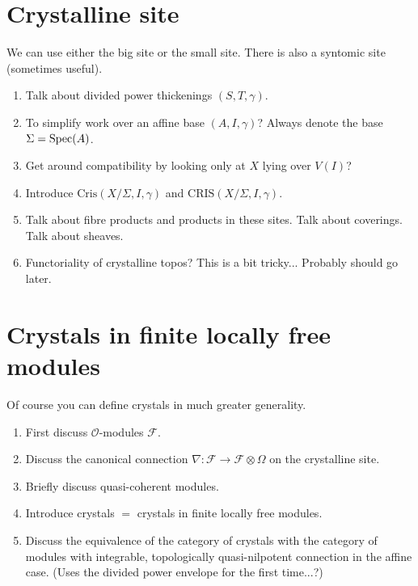 \section{Crystalline site}
\label{section-site}

\noindent
We can use either the big site or the small site.
There is also a syntomic site (sometimes useful).

\begin{enumerate}
\item Talk about divided power thickenings $(S, T, \gamma)$.
\item To simplify work over an affine base $(A, I, \gamma)$?
Always denote the base $\Sigma = \mathop{\rm Spec}(A)$.
\item Get around compatibility by looking only at $X$ lying over
$V(I)$?
\item Introduce $\text{Cris}(X/\Sigma, I, \gamma)$ and
$\text{CRIS}(X/\Sigma, I, \gamma)$.
\item Talk about fibre products and products in these sites.
Talk about coverings. Talk about sheaves.
\item Functoriality of crystalline topos? This is a bit tricky...
Probably should go later.
\end{enumerate}






\section{Crystals in finite locally free modules}
\label{section-crystals}

\noindent
Of course you can define crystals in much greater generality.

\begin{enumerate}
\item First discuss $\mathcal{O}$-modules $\mathcal{F}$.
\item Discuss the canonical connection
$\nabla : \mathcal{F} \to \mathcal{F} \otimes \Omega$
on the crystalline site.
\item Briefly discuss quasi-coherent modules.
\item Introduce crystals $=$ crystals in finite locally free modules.
\item Discuss the equivalence of the category of crystals with the
category of modules with integrable, topologically quasi-nilpotent
connection in the affine case. (Uses the divided power envelope for the
first time...?)
\end{enumerate}






